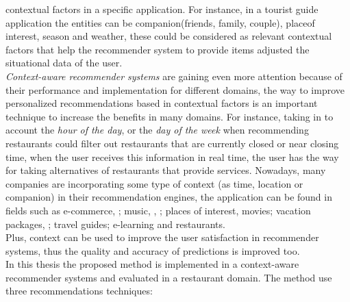 contextual factors in a specific application. For instance, in a
tourist guide application the entities can be companion(friends,
family, couple), placeof interest, season and weather, these could be
considered as relevant contextual factors that help the recommender
system to provide items adjusted the situational data of the user.\\
\textit{Context-aware recommender systems} are gaining even more
attention because of their performance and implementation for
different domains, the  way to improve personalized recommendations
based in contextual factors is an important technique to increase the
benefits in  many domains. For instance, taking in to account the
\textit{hour of the day},  or the \textit{day of the week} when
recommending restaurants could  filter out restaurants that are
currently closed or near closing time, when the user receives this
information in real time, the user has the  way for taking
alternatives of restaurants that provide services. Nowadays, many
companies are incorporating some type of context (as time, location or
companion) in their recommendation engines,  the application can be
found in fields such as e-commerce\cite{schafer1999recommender},
\cite{bulander2005enabling}; music\cite{ricci2012context}, 
\cite{baltrunas2011incarmusic}, \cite{huq2010automated}; 
places of interest\cite{baltrunas2012context},
movies\cite{eyjolfsdottir2010moviegen}; vacation
packages\cite{liu2011personalized}, \cite{liu2014cocktail}; 
travel guides\cite{savage2012m}; e-learning\cite{ortigosa2010entornos} 
and restaurants\cite{chu2013chinese}.\\
Plus, context can be used to improve the user satisfaction  in
recommender systems, thus the quality and accuracy of predictions  
is improved too.\\
In this thesis the proposed method is implemented in a context-aware 
recommender systems and evaluated in a restaurant domain. The method 
use three recommendations techniques:
